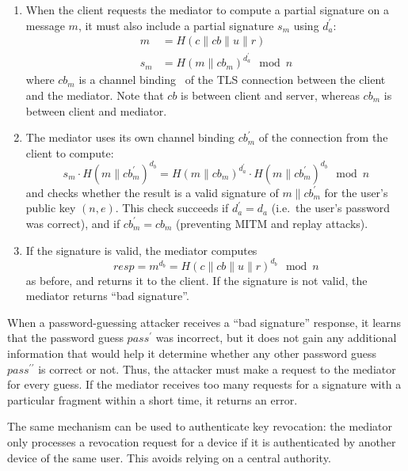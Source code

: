 \documentclass{llncs}
\newcommand*{\concat}{\mathbin{\|}}
\begin{document}
\begin{enumerate}
\item When the client requests the mediator to compute a partial signature on a message $m$, it must
also include a partial signature $s_m$ using $d_a^\prime$:
\begin{align}
    m &= H(c \concat \mathit{cb} \concat u \concat r) \\
    s_m &= H(m \concat \mathit{cb}_m)^{d_a^\prime} \mod n
\end{align}
where $\mathit{cb}_m$ is a channel binding~\cite{ChannelBinding} of the TLS connection between the
client and the mediator. Note that $\mathit{cb}$ is between client and server, whereas
$\mathit{cb}_m$ is between client and mediator.
\item The mediator uses its own channel binding $\mathit{cb}_m^\prime$ of the connection from the
client to compute:
\begin{equation}
s_m \cdot H(m \concat \mathit{cb}_m^\prime)^{d_b} =
  H(m \concat \mathit{cb}_m)^{d_a^\prime} \cdot
  H(m \concat \mathit{cb}_m^\prime)^{d_b} \mod n
\end{equation}
and checks whether the result is a valid signature of $m \concat \mathit{cb}_m^\prime$ for
the user's public key $(n, e)$. This check succeeds if $d_a^\prime = d_a$ (i.e.\ the user's password
was correct), and if $\mathit{cb}_m^\prime = \mathit{cb}_m$ (preventing MITM and replay attacks).
\item If the signature is valid, the mediator computes
\begin{equation}
\mathit{resp} = m^{d_b} = H(c \concat \mathit{cb} \concat u \concat r)^{d_b} \mod n
\end{equation}
as before, and returns it to the client. If the signature is not valid, the mediator returns ``bad
signature''.
\end{enumerate}

When a password-guessing attacker receives a ``bad signature'' response, it learns that the password
guess $\mathit{pass}^\prime$ was incorrect, but it does not gain any additional information that
would help it determine whether any other password guess $\mathit{pass}^{\prime\prime}$ is correct
or not. Thus, the attacker must make a request to the mediator for every guess. If the mediator
receives too many requests for a signature with a particular fragment within a short time, it
returns an error.

The same mechanism can be used to authenticate key revocation: the mediator only processes a
revocation request for a device if it is authenticated by another device of the same user. This
avoids relying on a central authority.
\end{document}

